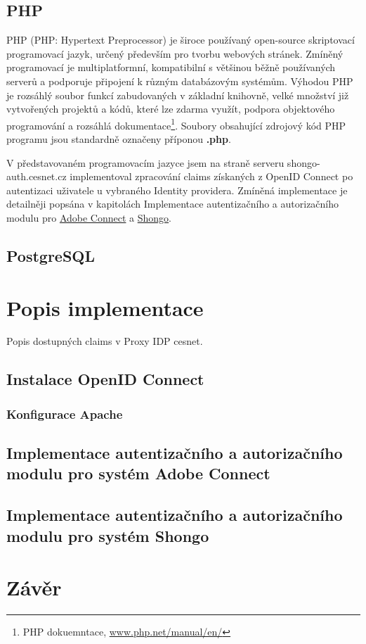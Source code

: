 \documentclass[
  printed, %
  twoside, %
  table,   %
  nolof,     %
  nolot,     %
]{fithesis3}
\begin{document}
\section{PHP}
PHP \cite{php5} (PHP: Hypertext Preprocessor) je široce používaný open-source skriptovací programovací jazyk, určený především pro tvorbu webových stránek. Zmíněný programovací je multiplatformní, kompatibilní s většinou běžně používaných serverů a podporuje připojení k různým databázovým systémům. Výhodou PHP je rozsáhlý soubor funkcí zabudovaných v základní knihovně, velké množství již vytvořených projektů a kódů, které lze zdarma využít, podpora objektového programování a rozsáhlá dokumentace\footnote{PHP dokuemntace, \url{www.php.net/manual/en/}}. Soubory obsahující zdrojový kód PHP programu jsou standardně označeny příponou \textbf{.php}. \par
V představovaném programovacím jazyce jsem na straně serveru shongo-auth.cesnet.cz implementoval zpracování claims získaných z OpenID Connect po autentizaci uživatele u vybraného Identity providera. Zmíněná implementace je detailněji popsána v kapitolách Implementace autentizačního a autorizačního modulu pro \hyperref[ACImpl]{Adobe Connect} a \hyperref[ShongoImpl]{Shongo}. 

\section{PostgreSQL}
\chapter{Popis implementace}
Popis dostupných claims v Proxy IDP cesnet. 
\section{Instalace OpenID Connect}
\subsection{Konfigurace Apache}
\label{apacheConfig}
\section{Implementace autentizačního a autorizačního modulu pro systém Adobe Connect}
\label{ACImpl}
\section{Implementace autentizačního a autorizačního modulu pro systém Shongo}
\label{ShongoImpl}
\chapter{Závěr}
\printbibliography[title={Literatura}]
\end{document}
